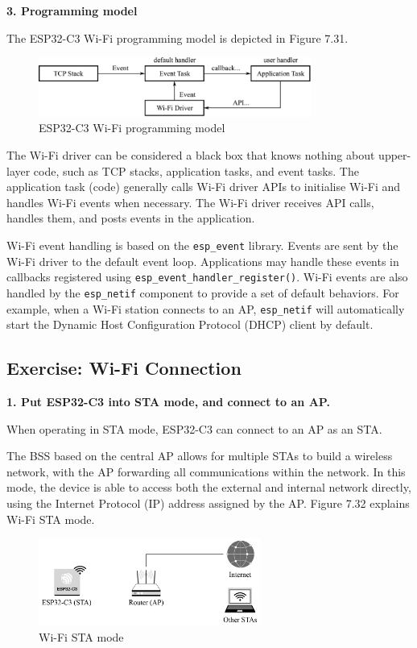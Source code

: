 \documentclass[a4paper,12pt,openany]{book}
\begin{document}
\textbf{3. Programming model}

The ESP32-C3 Wi-Fi programming model is depicted in Figure 7.31.

\begin{figure}[!h]
    \centering
    \includegraphics[width=0.8\textwidth]{D7Z/7-31}
    \caption{ESP32-C3 Wi-Fi programming model}
\end{figure}

The Wi-Fi driver can be considered a black box that knows nothing about upper-layer code, such as TCP stacks, application tasks, and event tasks. The application task (code) generally calls Wi-Fi driver APIs to initialise Wi-Fi and handles Wi-Fi events when necessary. The Wi-Fi driver receives API calls, handles them, and posts events in the application.

Wi-Fi event handling is based on the \verb|esp_event| library. Events are sent by the Wi-Fi driver to the default event loop. Applications may handle these events in callbacks registered using \verb|esp_event_handler_register()|. Wi-Fi events are also handled by the \verb|esp_netif| component to provide a set of default behaviors. For example, when a Wi-Fi station connects to an AP, \verb|esp_netif| will automatically start the Dynamic Host Configuration Protocol (DHCP) client by default.

\subsection{Exercise: Wi-Fi Connection}
\textbf{1. Put ESP32-C3 into STA mode, and connect to an AP.}

When operating in STA mode, ESP32-C3 can connect to an AP as an STA. 

The BSS based on the central AP allows for multiple STAs to build a wireless network, with the AP forwarding all communications within the network. In this mode, the device is able to access both the external and internal network directly, using the Internet Protocol (IP) address assigned by the AP. Figure 7.32 explains Wi-Fi STA mode.

\begin{figure}[!h]
    \centering
    \includegraphics[width=0.65\textwidth]{D7Z/7-32}
    \caption{Wi-Fi STA mode}
\end{figure}
\end{document}
